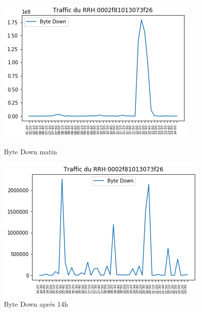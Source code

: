 \documentclass{report}
\begin{document}
\begin{figure}[!htb]
   \begin{minipage}{0.48\textwidth}
     \centering
     \includegraphics[scale=0.5]{images/byteDn1.png}
     \caption{Byte Down matin}\label{Fig:Data1}
   \end{minipage}\hfill
   \begin{minipage}{0.48\textwidth}
     \centering
     \includegraphics[scale=0.5]{images/byteDn2.png}
     \caption{Byte Down aprés 14h }\label{Fig:Data2}
   \end{minipage}
\end{figure} 
\end{document}
